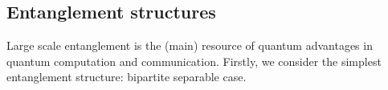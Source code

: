 \documentclass[
aps,
pra,
floatfix,
]{revtex4-2}
\theoremstyle{plain}
\theoremstyle{definition}
\newtheorem{definition}{Definition}
\newcommand{\dm}{\rho}
\begin{document}
\subsection{Entanglement structures}

Large scale entanglement is the (main) resource of quantum advantages in quantum computation and communication.
Firstly, we consider the simplest entanglement structure: bipartite separable case.
\end{document}
